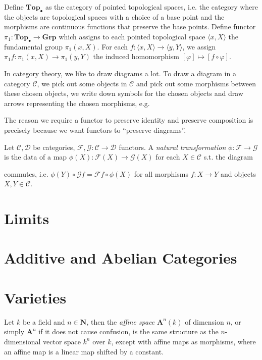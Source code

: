 \documentclass[11pt]{book}
\begin{document}
\begin{example}Define $\mathbf{Top}_{\bullet}$ as the category of pointed topological spaces, i.e. the category where the objects are topological spaces with a choice of a base point and the morphisms are continuous functions that preserve the base points. Define functor $\pi_1:\mathbf{Top}_{\bullet}\rightarrow\mathbf{Grp}$ which assigns to each pointed topological space $\langle x,X\rangle$ the fundamental group $\pi_1(x,X)$. For each $f:\langle x,X\rangle\rightarrow \langle y,Y\rangle$, we assign $\pi_1f:\pi_1(x,X)\rightarrow\pi_1(y,Y)$ the induced homomorphism $[\varphi]\mapsto [f\circ\varphi]$.
\end{example}

In category theory, we like to draw diagrams a lot. To draw a diagram in a category $\mathcal C$, we pick out some objects in $\mathcal C$ and pick out some morphisms between these chosen objects, we write down symbols for the chosen objects and draw arrows representing the chosen morphisms, e.g.



The reason we require a functor to preserve identity and preserve composition is precisely because we want functors to ``preserve diagrams''.
\begin{definition}Let $\mathcal C,\mathcal D$ be categories, $\mathscr{F},\mathscr{G}:\mathcal{C}\rightarrow\mathcal D$ functors. A \textit{natural transformation} $\phi:\mathscr{F}\rightarrow\mathscr{G}$ is the data of a map $\phi(X):\mathscr{F}(X)\rightarrow\mathscr{G}(X)$ for each $X\in\mathcal C$ s.t. the diagram

commutes, i.e. $\phi(Y)\circ \mathscr{G}f=\mathscr{F}f\circ\phi(X)$ for all morphisms $f:X\rightarrow Y$ and objects $X,Y\in\mathcal C$.
\end{definition}



\section{Limits}
\section{Additive and Abelian Categories}
\section{Varieties}
Let $k$ be a field and $n\in\mathbf N$, then the \textit{affine space} $\mathbf A^n(k)$ of dimension $n$, or simply $\mathbf A^n$ if it does not cause confusion, is the same structure as the $n$-dimensional vector space $k^n$ over $k$, except with affine maps as morphisms, where an affine map is a linear map shifted by a constant. 
\end{document}
